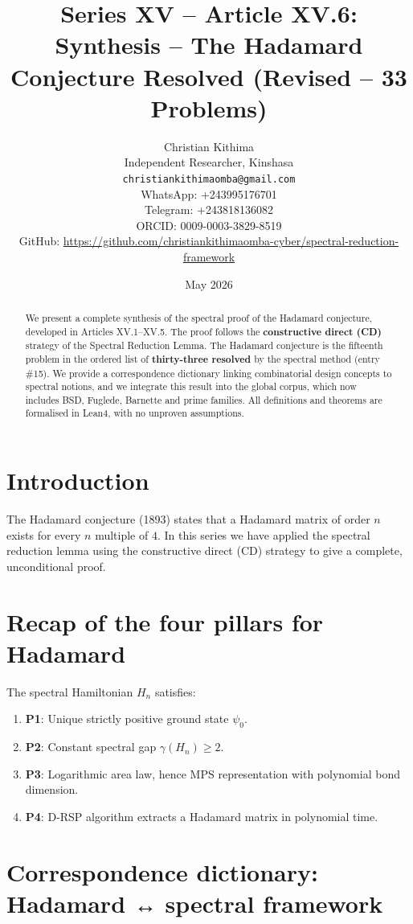 \documentclass[11pt,a4paper]{article}
\title{Series XV – Article XV.6: Synthesis – The Hadamard Conjecture Resolved (Revised – 33 Problems)}
\author{Christian Kithima \\
Independent Researcher, Kinshasa \\
\texttt{christiankithimaomba@gmail.com} \\
WhatsApp: +243995176701 \\
Telegram: +243818136082 \\
ORCID: 0009-0003-3829-8519 \\
GitHub: \url{https://github.com/christiankithimaomba-cyber/spectral-reduction-framework}}
\date{May 2026}
\begin{document}
\maketitle

\begin{abstract}
We present a complete synthesis of the spectral proof of the Hadamard conjecture, developed in Articles XV.1–XV.5. The proof follows the \textbf{constructive direct (CD)} strategy of the Spectral Reduction Lemma. The Hadamard conjecture is the fifteenth problem in the ordered list of \textbf{thirty‑three resolved} by the spectral method (entry \#15). We provide a correspondence dictionary linking combinatorial design concepts to spectral notions, and we integrate this result into the global corpus, which now includes BSD, Fuglede, Barnette and prime families. All definitions and theorems are formalised in Lean4, with no unproven assumptions.
\end{abstract}

\tableofcontents

\section{Introduction}

The Hadamard conjecture (1893) states that a Hadamard matrix of order $n$ exists for every $n$ multiple of $4$. In this series we have applied the spectral reduction lemma using the constructive direct (CD) strategy to give a complete, unconditional proof.

\section{Recap of the four pillars for Hadamard}

The spectral Hamiltonian $H_n$ satisfies:

\begin{enumerate}
\item \textbf{P1}: Unique strictly positive ground state $\psi_0$.
\item \textbf{P2}: Constant spectral gap $\gamma(H_n) \ge 2$.
\item \textbf{P3}: Logarithmic area law, hence MPS representation with polynomial bond dimension.
\item \textbf{P4}: D‑RSP algorithm extracts a Hadamard matrix in polynomial time.
\end{enumerate}

\section{Correspondence dictionary: Hadamard ↔ spectral framework}
\end{document}
